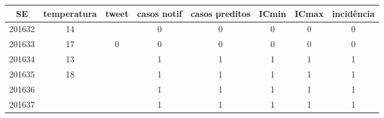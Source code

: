 \begin{tabular}{c|ccccccc}
  \hline
SE & temperatura & tweet & casos notif & casos preditos & ICmin & ICmax & incidência \\ 
  \hline
201632 & 14 &  & 0 & 0 & 0 & 0 & 0 \\ 
  201633 & 17 & 0 & 0 & 0 & 0 & 0 & 0 \\ 
  201634 & 13 &  & 1 & 1 & 1 & 1 & 1 \\ 
  201635 & 18 &  & 1 & 1 & 1 & 1 & 1 \\ 
  201636 &  &  & 1 & 1 & 1 & 1 & 1 \\ 
  201637 &  &  & 1 & 1 & 1 & 1 & 1 \\ 
   \hline
\end{tabular}
